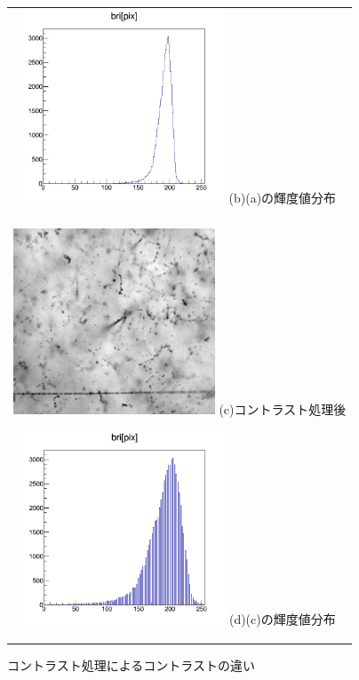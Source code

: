 \documentclass[12pt,a4paper]{jarticle}
\begin{document}
\begin{figure}[htbp]
\begin{tabular}{c}
        \begin{minipage}{0.5\hsize}
          \centering
            \includegraphics[clip, width=60mm]{row_hist.png}
            \hspace{1.6cm} (b)(a)の輝度値分布
        \end{minipage}
        \\
        \\
        \begin{minipage}{0.5\hsize}
          \centering
              \includegraphics[clip, width=60mm]{cont.png}
              \hspace{1.6cm} (c)コントラスト処理後
          \end{minipage}
          
        \begin{minipage}{0.5\hsize}
          \centering
              \includegraphics[clip, width=60mm]{cont_hist.png}
              \hspace{1.6cm} (d)(c)の輝度値分布
        \end{minipage}
    
      \end{tabular}
      \caption{コントラスト処理によるコントラストの違い\label{fig:do_contrust_beforeandafter}}
\end{figure}
\newpage
\end{document}
